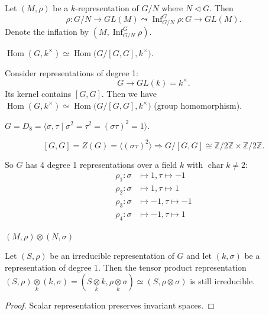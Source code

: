 \documentclass[11pt, a4paper]{report}
\begin{document}
\begin{definition}[Inflation]
Let $(M, \rho)$ be a $k$-representation of $G/N$ where $N \triangleleft G$. Then
\[
\rho: G/N \rightarrow GL(M) \leadsto \operatorname{Inf}_{G/N}^{G} \rho: G \rightarrow GL(M).
\]
Denote the inflation by $(M, \operatorname{Inf}_{G/N}^{G} \rho)$.
\end{definition}

\begin{proposition}
$\operatorname{Hom}(G, k^{\times}) \simeq \operatorname{Hom}\bigl(G/[G,G], k^{\times}\bigr)$.

Consider representations of degree 1:
\[
G \rightarrow GL(k) = k^{\times}.
\]
Its kernel contains $[G, G]$. Then we have $\operatorname{Hom}(G, k^{\times}) \simeq \operatorname{Hom}\bigl(G/[G,G], k^{\times}\bigr)$ (group homomorphism).
\end{proposition}

\begin{example}
$G = D_{8} = \langle \sigma, \tau \mid \sigma^{2} = \tau^{2} = (\sigma\tau)^{2} = 1 \rangle$.

\[
[G,G] = Z(G) = \langle (\sigma\tau)^{2} \rangle \Rightarrow G/[G,G] \cong \mathbb{Z}/2\mathbb{Z} \times \mathbb{Z}/2\mathbb{Z}.
\]

So $G$ has 4 degree 1 representations over a field $k$ with $\operatorname{char} k \neq 2$:
\begin{align*}
\rho_{1}: \sigma &\mapsto 1, \tau \mapsto -1 \\
\rho_{2}: \sigma &\mapsto 1, \tau \mapsto 1 \\
\rho_{3}: \sigma &\mapsto -1, \tau \mapsto -1 \\
\rho_{4}: \sigma &\mapsto -1, \tau \mapsto 1
\end{align*}
\end{example}

\begin{lemma}
$(M, \rho) \otimes (N, \sigma)$
\end{lemma}
Let $(S, \rho)$ be an irreducible representation of $G$ and let $(k, \sigma)$ be a representation of degree $1$. Then the tensor product representation $(S, \rho) \underset{k}{\otimes} (k, \sigma) = (S \underset{k}{\otimes} k, \rho \underset{k}{\otimes} \sigma) \simeq (S, \rho \otimes \sigma)$ is still irreducible.

\begin{proof}
Scalar representation preserves invariant spaces.
\end{proof}
\end{document}
